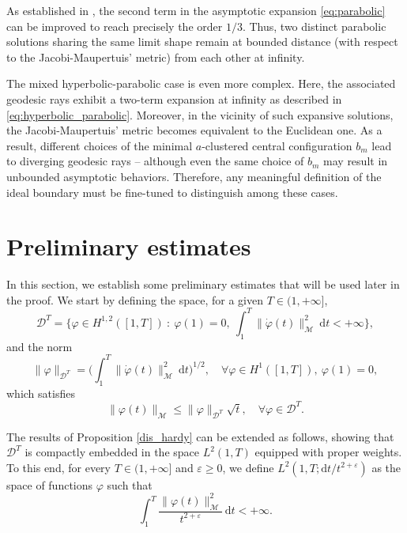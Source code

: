 \documentclass[a4paper,10pt]{amsart}
\newcommand{\ud}{\mathrm{d}}
\theoremstyle{plain}
\theoremstyle{definition}
\numberwithin{equation}{section}
\numberwithin{thm}{section}
\begin{document}
As established in \cite{BPT2026}, the second term in the asymptotic expansion \eqref{eq:parabolic} can be improved to reach precisely the order $1/3$. Thus, two distinct parabolic solutions sharing the same limit shape remain at bounded distance (with respect to the Jacobi-Maupertuis' metric) from each other at infinity.
  

The mixed hyperbolic-parabolic case is even more complex. Here, the associated geodesic rays exhibit a two-term expansion at infinity as described in \eqref{eq:hyperbolic_parabolic}. Moreover, in the vicinity of such expansive solutions, the Jacobi-Maupertuis' metric becomes equivalent to the Euclidean one. As a result, different choices of the minimal $a$-clustered central configuration $b_m$ lead to diverging geodesic rays -- although even the same choice of $b_m$ may result in unbounded asymptotic behaviors. Therefore, any meaningful definition of the ideal boundary must be fine-tuned to distinguish among these cases.



\section{Preliminary estimates}

In this section, we establish some preliminary estimates that will be used later in the proof. We start by defining the space, for a given $T\in(1,+\infty]$,
\[
\mathcal{D}^T= \{\varphi\in H^{1,2}([1,T])\ :\ \varphi(1)=0,\ \int_{1}^{T}\|\dot\varphi(t)\|^2_\mathcal{M}\ \ud t<+\infty\},
\]
and the norm
\[
    \|\varphi\|_{\mathcal{D}^T} = \bigg( \int_{1}^{T} \|\dot{\varphi}(t)\|_\mathcal{M}^2\ \ud t \bigg)^{1/2},\quad \forall \varphi\in H^1([1,T]),\ \varphi(1)=0,
\]
which satisfies
\begin{displaymath}\label{dis:norm_T}
    \|\varphi(t)\|_\mathcal{M} \leq \|\varphi\|_{\mathcal{D}^T} \sqrt{t},\quad \forall \varphi\in \mathcal{D}^T.
\end{displaymath}

The results of Proposition \ref{dis_hardy} can be extended as follows, showing that $\mathcal{D}^T$ is compactly embedded in the space $L^2(1,T)$ equipped with proper weights. 
To this end, for every $T\in (1,+\infty]$ and $\varepsilon\ge 0$, we define $L^2(1,T;\ud t/t^{2+\varepsilon})$ as the space of functions $\varphi$ such that
\[
\int_1^T \frac{\|\varphi(t)\|_{\mathcal{M}}^2}{t^{2+\varepsilon}}\, \ud t < +\infty.
\]
\end{document}

